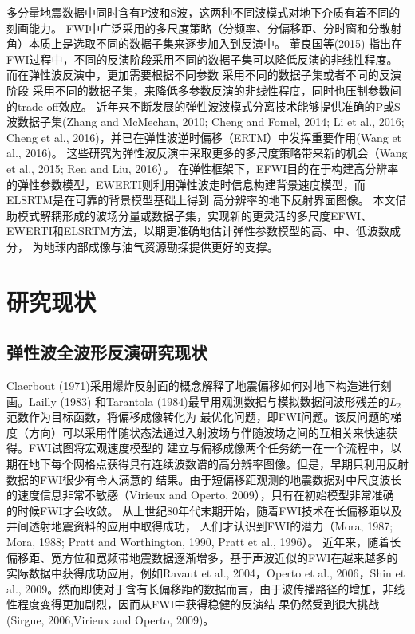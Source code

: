 多分量地震数据中同时含有P波和S波，这两种不同波模式对地下介质有着不同的刻画能力。
FWI中广泛采用的多尺度策略（分频率、分偏移距、分时窗和分散射角）本质上是选取不同的数据子集来逐步加入到反演中。
董良国等(2015)\cite{董良国2015}
指出在FWI过程中，不同的反演阶段采用不同的数据子集可以降低反演的非线性程度。而在弹性波反演中，更加需要根据不同参数
采用不同的数据子集或者不同的反演阶段
采用不同的数据子集，来降低多参数反演的非线性程度，同时也压制参数间的trade-off效应。
近年来不断发展的弹性波波模式分离技术能够提供准确的P或S波数据子集(Zhang and McMechan,
2010\cite{zhang.mcmechan:2010}; Cheng and Fomel,
2014\cite{cheng:2014b}; Li et al., 2016\cite{Li2016a}; Cheng et al.,
2016\cite{cheng:2016})，并已在弹性波逆时偏移（ERTM）中发挥重要作用(Wang et al.,
2016\cite{wang2016scalar})。
这些研究为弹性波反演中采取更多的多尺度策略带来新的机会（Wang et al., 2015\cite{wang:2015}; Ren and
Liu, 2016\cite{ren.liu:2016}）。
在弹性框架下，EFWI目的在于构建高分辨率的弹性参数模型，EWERTI则利用弹性波走时信息构建背景速度模型，而ELSRTM是在可靠的背景模型基础上得到
高分辨率的地下反射界面图像。
本文借助模式解耦形成的波场分量或数据子集，实现新的更灵活的多尺度EFWI、EWERTI和ELSRTM方法，以期更准确地估计弹性参数模型的高、中、低波数成分，
为地球内部成像与油气资源勘探提供更好的支撑。

\section{研究现状}
\subsection{弹性波全波形反演研究现状}
Claerbout
(1971\cite{Claerbout1971})采用爆炸反射面的概念解释了地震偏移如何对地下构造进行刻画。Lailly
(1983)\cite{lailly1983seismic}
和Tarantola (1984)\cite{tarantola1984}最早用观测数据与模拟数据间波形残差的$L_2$范数作为目标函数，将偏移成像转化为
最优化问题，即FWI问题。该反问题的梯度（方向）可以采用伴随状态法通过入射波场与伴随波场之间的互相关来快速获得。FWI试图将宏观速度模型的
建立与偏移成像两个任务统一在一个流程中，以期在地下每个网格点获得具有连续波数谱的高分辨率图像。但是，早期只利用反射数据的FWI很少有令人满意的
结果。由于短偏移距观测的地震数据对中尺度波长的速度信息非常不敏感（Virieux and Operto,
2009\cite{virieux2009overview}），只有在初始模型非常准确
的时候FWI才会收敛。
从上世纪80年代末期开始，随着FWI技术在长偏移距以及井间透射地震资料的应用中取得成功，
人们才认识到FWI的潜力（Mora, 1987\cite{mora:1987}; Mora, 1988\cite{mora1988elastic}; Pratt
and Worthington, 1990\cite{PRATTEtAl1990}, Pratt et al., 1996\cite{pratt1996two}）。
近年来，随着长偏移距、宽方位和宽频带地震数据逐渐增多，基于声波近似的FWI在越来越多的实际数据中获得成功应用，例如Ravaut
et al., 2004\cite{RavautEtAl2004}，Operto et al., 2006\cite{Operto2006}，Shin et al.,
2009\cite{ShinEtAl2009}。然而即使对于含有长偏移距的数据而言，由于波传播路径的增加，非线性程度变得更加剧烈，因而从FWI中获得稳健的反演结
果仍然受到很大挑战(Sirgue, 2006\cite{sirgue2006importance},Virieux and Operto,
2009\cite{virieux2009overview})。

